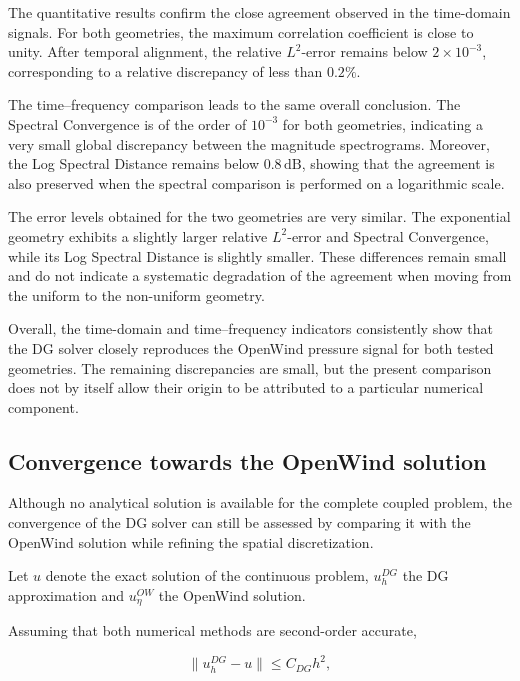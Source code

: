 \documentclass[11pt,a4paper]{report}
\theoremstyle{plain}
\theoremstyle{definition}
\begin{document}
The quantitative results confirm the close agreement observed in the
time-domain signals. For both geometries, the maximum correlation coefficient
is close to unity. After temporal alignment, the relative \(L^2\)-error remains
below \(2\times10^{-3}\), corresponding to a relative discrepancy of less than
\(0.2\%\).

The time--frequency comparison leads to the same overall conclusion. The
Spectral Convergence is of the order of \(10^{-3}\) for both geometries,
indicating a very small global discrepancy between the magnitude
spectrograms. Moreover, the Log Spectral Distance remains below
\(0.8\,\mathrm{dB}\), showing that the agreement is also preserved when the
spectral comparison is performed on a logarithmic scale.

The error levels obtained for the two geometries are very similar. The
exponential geometry exhibits a slightly larger relative \(L^2\)-error and
Spectral Convergence, while its Log Spectral Distance is slightly smaller.
These differences remain small and do not indicate a systematic degradation
of the agreement when moving from the uniform to the non-uniform geometry.

Overall, the time-domain and time--frequency indicators consistently show that
the DG solver closely reproduces the OpenWind pressure signal for both tested
geometries. The remaining discrepancies are small, but the present comparison
does not by itself allow their origin to be attributed to a particular
numerical component.


\subsection{Convergence towards the OpenWind solution}

Although no analytical solution is available for the complete coupled problem,
the convergence of the DG solver can still be assessed by comparing it with the
OpenWind solution while refining the spatial discretization.

Let \(u\) denote the exact solution of the continuous problem,
\(u_h^{DG}\) the DG approximation and
\(u_\eta^{OW}\) the OpenWind solution.

Assuming that both numerical methods are second-order accurate,

\begin{equation}
\|u_h^{DG}-u\|
\le
C_{DG}h^2,
\end{equation}
\end{document}
